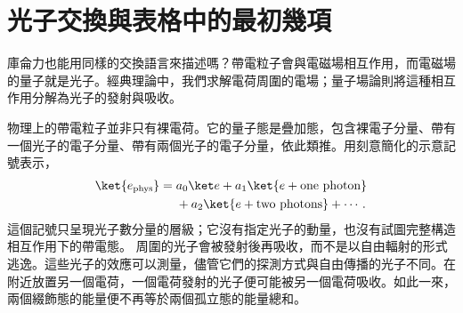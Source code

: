 \begin{classroomqa}
\end{classroomqa}

\begin{classroomqa}
\end{classroomqa}

\begin{classroomqa}
\end{classroomqa}

\begin{classroomqa}
\end{classroomqa}

\section{光子交換與表格中的最初幾項}

庫侖力也能用同樣的交換語言來描述嗎？帶電粒子會與電磁場相互作用，而電磁場的量子就是光子。經典理論中，我們求解電荷周圍的電場；量子場論則將這種相互作用分解為光子的發射與吸收。

物理上的帶電粒子並非只有裸電荷。它的量子態是疊加態，包含裸電子分量、帶有一個光子的電子分量、帶有兩個光子的電子分量，依此類推。用刻意簡化的示意記號表示，
\begin{equation}
\begin{aligned}
\ket{e_{\mathrm{phys}}}
={}&a_0\ket e
+a_1\ket{e+\text{one photon}}
\\
&+a_2\ket{e+\text{two photons}}+\cdots .
\end{aligned}
\end{equation}
這個記號只呈現光子數分量的層級；它沒有指定光子的動量，也沒有試圖完整構造相互作用下的帶電態。
周圍的光子會被發射後再吸收，而不是以自由輻射的形式逃逸。這些光子的效應可以測量，儘管它們的探測方式與自由傳播的光子不同。在附近放置另一個電荷，一個電荷發射的光子便可能被另一個電荷吸收。如此一來，兩個綴飾態的能量便不再等於兩個孤立態的能量總和。

